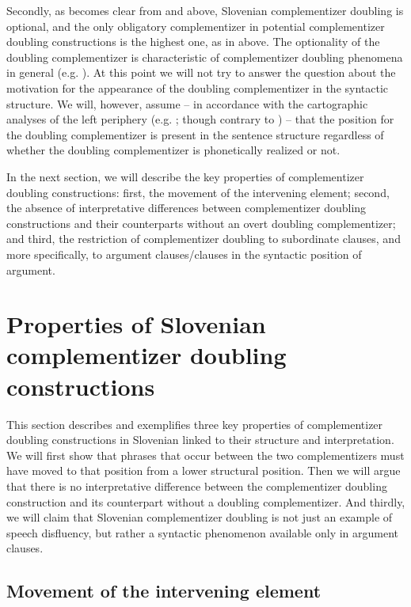 \documentclass[output=paper,
]{langscibook}
\begin{document}
Secondly, as becomes clear from   and   above, Slovenian complementizer doubling is optional, and the only obligatory complementizer in potential complementizer doubling constructions is the highest one, as in   above. The optionality of the doubling complementizer is characteristic of complementizer doubling phenomena in general (e.g. \citealt{ledgeway2005, dagnac2012, munaro2016}). At this point we will not try to answer the question about the motivation for the appearance of the doubling complementizer in the syntactic structure. We will, however, assume – in accordance with the cartographic analyses of the left periphery (e.g. \citealt{rizzi2004}; though contrary to \citealt{mismas2015}) – that the position for the doubling complementizer is present in the sentence structure regardless of whether the doubling complementizer is phonetically realized or not.

In the next section, we will describe the key properties of complementizer doubling constructions: first, the movement of the intervening element; second, the absence of interpretative differences between complementizer doubling constructions and their counterparts without an overt doubling complementizer; and third, the restriction of complementizer doubling to subordinate clauses, and more specifically, to argument clauses/clauses in the syntactic position of argument.

\section{Properties of Slovenian complementizer doubling constructions}\label{sec:plesnicar:s2}
This section describes and exemplifies three key properties of complementizer doubling constructions in Slovenian linked to their structure and interpretation. We will first show that phrases that occur between the two complementizers must have moved to that position from a lower structural position. Then we will argue that there is no interpretative difference between the complementizer doubling construction and its counterpart without a doubling complementizer. And thirdly, we will claim that Slovenian complementizer doubling is not just an example of speech disfluency, but rather a syntactic phenomenon available only in argument clauses.

\subsection{Movement of the intervening element} \label{s21}
\end{document}
